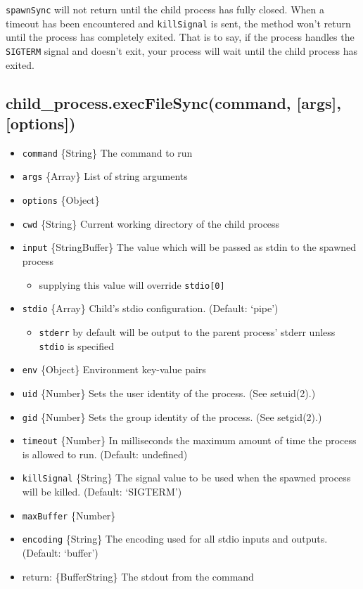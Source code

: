 \texttt{spawnSync} will not return until the child process has fully
closed. When a timeout has been encountered and \texttt{killSignal} is
sent, the method won't return until the process has completely exited.
That is to say, if the process handles the \texttt{SIGTERM} signal and
doesn't exit, your process will wait until the child process has exited.

\subsection{child\_process.execFileSync(command, {[}args{]},
{[}options{]})}\label{childux5fprocess.execfilesynccommand-args-options}

\begin{itemize}
\itemsep1pt\parskip0pt
\item
  \texttt{command} \{String\} The command to run
\item
  \texttt{args} \{Array\} List of string arguments
\item
  \texttt{options} \{Object\}
\item
  \texttt{cwd} \{String\} Current working directory of the child process
\item
  \texttt{input} \{String\textbar{}Buffer\} The value which will be
  passed as stdin to the spawned process

  \begin{itemize}
  \itemsep1pt\parskip0pt
  \item
    supplying this value will override \texttt{stdio{[}0{]}}
  \end{itemize}
\item
  \texttt{stdio} \{Array\} Child's stdio configuration. (Default:
  `pipe')

  \begin{itemize}
  \itemsep1pt\parskip0pt
  \item
    \texttt{stderr} by default will be output to the parent process'
    stderr unless \texttt{stdio} is specified
  \end{itemize}
\item
  \texttt{env} \{Object\} Environment key-value pairs
\item
  \texttt{uid} \{Number\} Sets the user identity of the process. (See
  setuid(2).)
\item
  \texttt{gid} \{Number\} Sets the group identity of the process. (See
  setgid(2).)
\item
  \texttt{timeout} \{Number\} In milliseconds the maximum amount of time
  the process is allowed to run. (Default: undefined)
\item
  \texttt{killSignal} \{String\} The signal value to be used when the
  spawned process will be killed. (Default: `SIGTERM')
\item
  \texttt{maxBuffer} \{Number\}
\item
  \texttt{encoding} \{String\} The encoding used for all stdio inputs
  and outputs. (Default: `buffer')
\item
  return: \{Buffer\textbar{}String\} The stdout from the command
\end{itemize}

